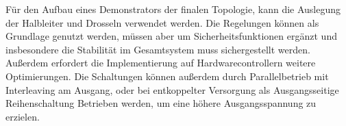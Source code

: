 Für den Aufbau eines Demonstrators der finalen Topologie, kann die Auslegung der Halbleiter und Drosseln verwendet werden. Die Regelungen können als Grundlage genutzt werden, müssen aber um Sicherheitsfunktionen ergänzt und insbesondere die Stabilität im Gesamtsystem muss sichergestellt werden. Außerdem erfordert die Implementierung auf Hardwarecontrollern weitere Optimierungen. Die Schaltungen können außerdem durch Parallelbetrieb mit Interleaving am Ausgang, oder bei entkoppelter Versorgung als Ausgangsseitige Reihenschaltung Betrieben werden, um eine höhere Ausgangsspannung zu erzielen.  